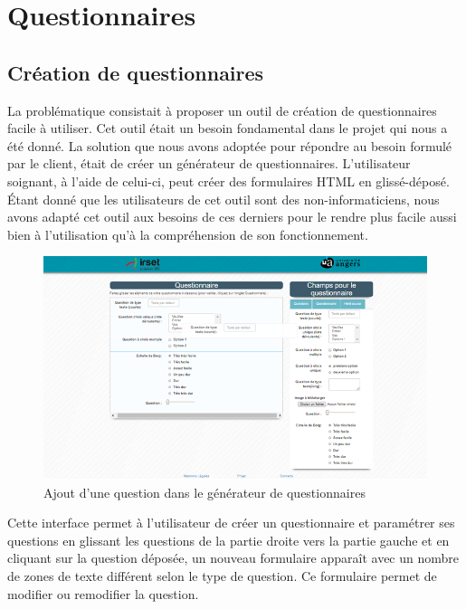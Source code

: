 \section{Questionnaires}

\subsection{Création de questionnaires}
La problématique consistait à proposer un outil de création de questionnaires facile à utiliser. Cet outil était un besoin fondamental dans le projet qui nous a été donné. La solution que nous avons adoptée pour répondre au besoin formulé par le client, était de créer un générateur de questionnaires. L’utilisateur soignant, à l'aide de celui-ci, peut créer des formulaires HTML en glissé-déposé. Étant donné que les utilisateurs de cet outil sont des non-informaticiens, nous avons adapté cet outil aux besoins de ces derniers pour le rendre plus facile aussi bien à l’utilisation qu'à la compréhension de son fonctionnement.

\begin{figure}[H]
    \begin{center}
	\includegraphics[scale=0.8]{img/questionnaire/generateur}
    \end{center}
    \caption{Ajout d'une question dans le générateur de questionnaires}
\end{figure}



Cette interface permet à l'utilisateur de créer un questionnaire et paramétrer ses questions en glissant les questions de la partie droite vers la partie gauche et en cliquant sur la question déposée, un nouveau formulaire apparaît avec un nombre de zones de texte différent selon le type de question. Ce formulaire permet de modifier ou remodifier la question.


